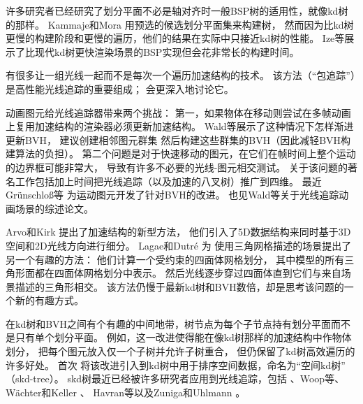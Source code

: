 许多研究者已经研究了划分平面不必是轴对齐时一般BSP树的适用性，就像kd树的那样。
Kammaje和Mora \parencite*{4342591}用预选的候选划分平面集来构建树，
然而因为比kd树更慢的构建阶段和更慢的遍历，他们的结果在实际中只接近kd树的性能。
Ize等\parencite*{4634637}展示了比现代kd树更快渲染场景的BSP实现但会花非常长的构建时间。

有很多让一组光线一起而不是每次一个遍历加速结构的技术。
该方法（“包追踪”）是高性能光线追踪的重要组成；
会更深入地讨论它。

动画图元给光线追踪器带来两个挑战：
第一，如果物体在移动则尝试在多帧动画上复用加速结构的渲染器必须更新加速结构。
Wald等\parencite*{10.2312:egst.20071056}展示了这种情况下怎样渐进更新BVH，
\citet{10.1111/j.1467-8659.2009.01497.x}建议创建相邻图元群集
然后构建这些群集的BVH（因此减轻BVH构建算法的负担）。
第二个问题是对于快速移动的图元，在它们在帧时间上整个运动的边界框可能非常大，
导致有许多不必要的光线-图元相交测试。
关于该问题的著名工作包括\citet{504}加上时间把光线追踪（以及加速的八叉树）推广到四维。
最近Gr\"{u}nschlo\ss{}等\parencite*{10.1145/2018323.2018334}
为运动图元开发了针对BVH的改进。
也见Wald等\parencite*{10.2312:egst.20071056}关于光线追踪动画场景的综述论文。

Arvo和Kirk \parencite*{10.1145/37401.37409}提出了加速结构的新型方法，
他们引入了5D数据结构来同时基于3D空间和2D光线方向进行细分。
Lagae和Dutré \parencite*{10.1111/j.1467-8659.2008.01269.x}为
使用三角网格描述的场景提出了另一个有趣的方法：
他们计算一个受约束的四面体网格划分，
其中模型的所有三角形面都在四面体网格划分中表示。
然后光线逐步穿过四面体直到它们与来自场景描述的三角形相交。
该方法仍慢于最新kd树和BVH数倍，却是思考该问题的一个新的有趣方式。

在kd树和BVH之间有个有趣的中间地带，树节点为每个子节点持有划分平面而不是只有单个划分平面。
例如，这一改进使得能在像kd树那样的加速结构中作物体划分，
把每个图元放入仅一个子树并允许子树重合，
但仍保留了kd树高效遍历的许多好处。
\citet{10.1007/978-3-642-72617-0_17}首次
将该改进引入到kd树中用于排序空间数据，命名为“空间kd树”
（skd-tree）。
skd树最近已经被许多研究者应用到光线追踪，包括
\citet{10.1145/585740.585761}、Woop等\parencite*{10.1145/1283900.1283912}、
W\"{a}chter和Keller \parencite*{10.5555/2383894.2383912}、
Havran等\parencite*{4061548}以及Zuniga和Uhlmann \parencite*{2151237X.2006.10129224}。

